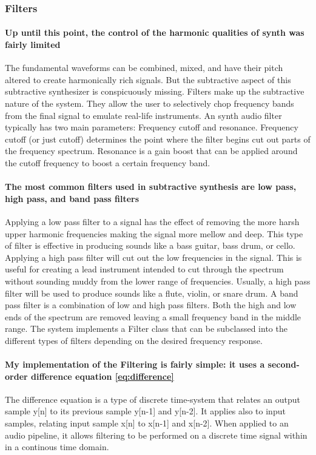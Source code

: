 \documentclass[acmlarge,screen]{acmart}
\begin{document}
	\subsubsection{Filters}
	\paragraph{Up until this point, the control of the harmonic qualities of synth was fairly limited} The fundamental waveforms can be combined, mixed, and have their pitch altered to create harmonically rich signals. But the subtractive aspect of this subtractive synthesizer is conspicuously missing. Filters make up the subtractive nature of the system. They allow the user to selectively chop frequency bands from the final signal to emulate real-life instruments.\cite{welsh_2006} An synth audio filter typically has two main parameters: Frequency cutoff and resonance. Frequency cutoff (or just cutoff) determines the point where the filter begins cut out parts of the frequency spectrum. Resonance is a gain boost that can be applied around the cutoff frequency to boost a certain frequency band. \cite{musictech}
	
	\paragraph{The most common filters used in subtractive synthesis are low pass, high pass, and band pass filters} Applying a low pass filter to a signal has the effect of removing the more harsh upper harmonic frequencies making the signal more mellow and deep. This type of filter is effective in producing sounds like a bass guitar, bass drum, or cello. Applying a high pass filter will cut out the low frequencies in the signal. This is useful for creating a lead instrument intended to cut through the spectrum without sounding muddy from the lower range of frequencies. Usually, a high pass filter will be used to produce sounds like a flute, violin, or snare drum. A band pass filter is a combination of low and high pass filters. Both the high and low ends of the spectrum are removed leaving a small frequency band in the middle range. The system implements a Filter class that can be subclassed into the different types of filters depending on the desired frequency response. \cite{hass_2021} 
	
	\paragraph{My implementation of the Filtering is fairly simple: it uses a second-order difference equation \eqref{eq:difference}} The difference equation is a type of discrete time-system that relates an output sample y[n] to its previous sample y[n-1] and y[n-2]. It applies also to input samples, relating input sample x[n] to x[n-1] and x[n-2]. When applied to an audio pipeline, it allows filtering to be performed on a discrete time signal within in a continous time domain.\cite{stanford_2007}
	
\end{document}
